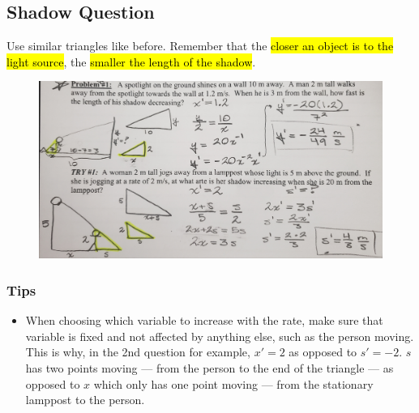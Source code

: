 \documentclass[a4paper,12pt]{article}
\begin{document}
\subsection{Shadow Question}
Use similar triangles like before. Remember that the \hl{closer an object is to the light source}, the \hl{smaller the length of the shadow}.
\begin{figure}[H]
    \centering
    \includegraphics[width=\textwidth]{shadow}
\end{figure}

\subsubsection{Tips}
\begin{itemize}
    \item{When choosing which variable to increase with the rate, make sure that variable is fixed and not affected by anything else, such as the person moving.\\This is why, in the 2nd question for example, $x' = 2$ as opposed to $s' = -2$. $s$ has two points moving --- from the person to the end of the triangle --- as opposed to $x$ which only has one point moving --- from the stationary lamppost to the person.}
\end{itemize}



    
\end{document}
